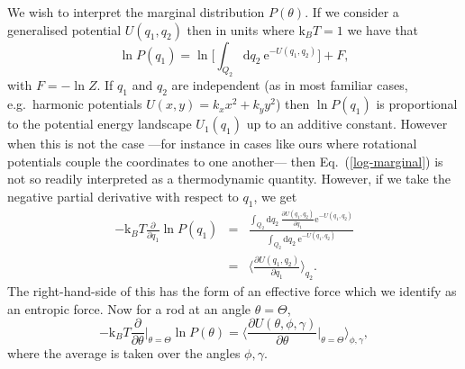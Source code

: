 \documentclass[aps,prl,reprint,twocolumn,superscriptaddress,showpacs]{revtex4-1}
\newcommand{\dd}{\mathrm{d}}
\newcommand{\ee}{\mathrm{e}}
\newcommand{\kk}{\mathrm{k}_B}
\begin{document}
 
%
%
%
%
%
%
%
 We wish to interpret the marginal distribution $P(\theta)$. If we consider a generalised potential $U(q_1,q_2)$ then in units where $\kk T=1$ we have that
\begin{equation}\label{log-marginal}
\ln{P(q_1)} = \ln\Big[ \int_{Q_2} \dd q_2\ \ee^{-U(q_1,q_2)} \Big] + F,
\end{equation}with $F=-\ln Z$. If $q_1$ and $q_2$ are independent (as in most familiar cases, e.g.\ harmonic potentials $U(x,y)= k_x x^2 + k_y y^2$) then $\ln P(q_1)$ is proportional to the potential energy landscape $U_1(q_1)$ up to an additive constant. However when this is not the case ---for instance in cases like ours where rotational potentials couple the coordinates to one another--- then Eq.\ (\ref{log-marginal}) is not so readily interpreted as a thermodynamic quantity. However, if we take the negative partial derivative with respect to $q_1$, we get
\begin{eqnarray}
-\kk T\frac{\partial }{\partial q_1} \ln{P(q_1)} & = & \frac{\int_{Q_2} \dd q_2 \ \frac{\partial U(q_1,q_2)}{\partial q_1} \ee^{-U(q_1,q_2)} }{\int_{Q_2} \dd q_2 \  \ee^{-U(q_1,q_2)}}\nonumber \\ 
& = & \Big\langle \frac{\partial U(q_1,q_2)}{\partial q_1} \Big\rangle_{q_2}.
\end{eqnarray}
The right-hand-side of this has the form of an effective force which we identify as an entropic force. Now for a rod at an angle $\theta=\Theta$,
\begin{equation} \label{entropicforce}
-\kk T\frac{\partial }{\partial \theta}\Big|_{\theta=\Theta} \ln{P(\theta)}  = \Big\langle \frac{\partial U(\theta,\phi,\gamma)}{\partial \theta}\Big|_{\theta=\Theta} \Big\rangle_{\phi,\gamma},
\end{equation}where the average is taken over the angles $\phi,\gamma$.
\end{document}
